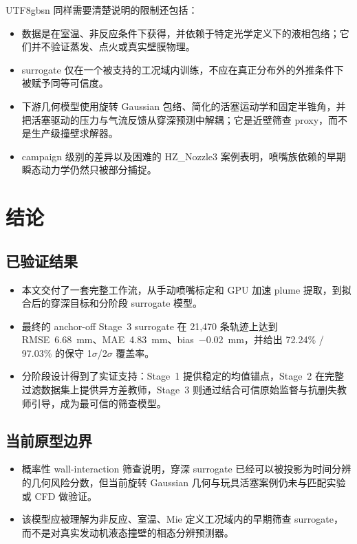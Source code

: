 \documentclass[english, 12pt, a4paper, elec, utf8, a-2b, online]{aaltothesis}
\begin{document}
\begin{CJK*}{UTF8}{gbsn}
同样需要清楚说明的限制还包括：
\begin{itemize}
  \item 数据是在室温、非反应条件下获得，并依赖于特定光学定义下的液相包络；它们并不验证蒸发、点火或真实壁膜物理。
  \item surrogate 仅在一个被支持的工况域内训练，不应在真正分布外的外推条件下被赋予同等可信度。
  \item 下游几何模型使用旋转 Gaussian 包络、简化的活塞运动学和固定半锥角，并把活塞驱动的压力与气流反馈从穿深预测中解耦；它是近壁筛查 proxy，而不是生产级撞壁求解器。
  \item campaign 级别的差异以及困难的 HZ\_Nozzle3 案例表明，喷嘴族依赖的早期瞬态动力学仍然只被部分捕捉。
\end{itemize}

\section{结论}

\subsection{已验证结果}

\begin{itemize}
  \item 本文交付了一套完整工作流，从手动喷嘴标定和 GPU 加速 plume 提取，到拟合后的穿深目标和分阶段 surrogate 模型。
  \item 最终的 anchor-off Stage~3 surrogate 在 21{,}470 条轨迹上达到 RMSE~\SI{6.68}{mm}、MAE~\SI{4.83}{mm}、bias~\SI{-0.02}{mm}，并给出 72.24\% / 97.03\% 的保守 1$\sigma$/2$\sigma$ 覆盖率。
  \item 分阶段设计得到了实证支持：Stage~1 提供稳定的均值锚点，Stage~2 在完整过滤数据集上提供异方差教师，Stage~3 则通过结合可信原始监督与抗删失教师引导，成为最可信的筛查模型。
\end{itemize}

\subsection{当前原型边界}

\begin{itemize}
  \item 概率性 wall-interaction 筛查说明，穿深 surrogate 已经可以被投影为时间分辨的几何风险分数，但当前旋转 Gaussian 几何与玩具活塞案例仍未与匹配实验或 CFD 做验证。
  \item 该模型应被理解为非反应、室温、Mie 定义工况域内的早期筛查 surrogate，而不是对真实发动机液态撞壁的相态分辨预测器。
\end{itemize}


\end{CJK*}
\end{document}
